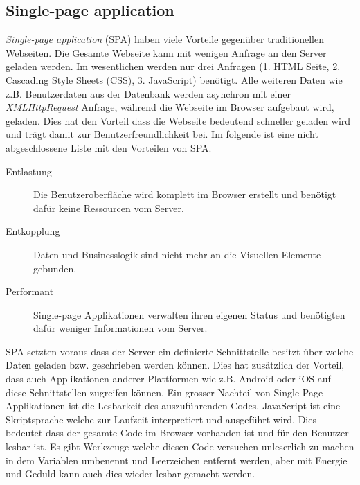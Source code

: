 \subsection{Single-page application}
\textit{Single-page application} (SPA) haben viele Vorteile gegenüber traditionellen Webseiten. Die Gesamte Webseite kann mit wenigen Anfrage an den Server geladen werden. Im wesentlichen werden nur drei Anfragen (1. HTML Seite, 2. Cascading Style Sheets (CSS), 3. JavaScript) benötigt. Alle weiteren Daten wie z.B. Benutzerdaten aus der Datenbank werden asynchron mit einer \textit{XMLHttpRequest} Anfrage, während die Webseite im Browser aufgebaut wird, geladen. Dies hat den Vorteil dass die Webseite bedeutend schneller geladen wird und trägt damit zur Benutzerfreundlichkeit bei. Im folgende ist eine nicht abgeschlossene Liste mit den Vorteilen von SPA.
\begin{description}
	\item[Entlastung] Die Benutzeroberfläche wird komplett im Browser erstellt und benötigt dafür keine Ressourcen vom Server.
	\item[Entkopplung] Daten und Businesslogik sind nicht mehr an die Visuellen Elemente gebunden.
	\item[Performant] Single-page Applikationen verwalten ihren eigenen Status und benötigten dafür weniger Informationen vom Server.
\end{description}
SPA setzten voraus dass der Server ein definierte Schnittstelle besitzt über welche Daten geladen bzw. geschrieben werden können. Dies hat zusätzlich der Vorteil, dass auch Applikationen anderer Plattformen wie z.B. Android oder iOS auf diese Schnittstellen zugreifen können.
\newline{}
Ein grosser Nachteil von Single-Page Applikationen ist die Lesbarkeit des auszuführenden Codes. JavaScript ist eine Skriptsprache welche zur Laufzeit interpretiert und ausgeführt wird. Dies bedeutet dass der gesamte Code im Browser vorhanden ist und für den Benutzer lesbar ist. Es gibt Werkzeuge welche diesen Code versuchen unleserlich zu machen in dem Variablen umbenennt und Leerzeichen entfernt werden, aber mit Energie und Geduld kann auch dies wieder lesbar gemacht werden.

